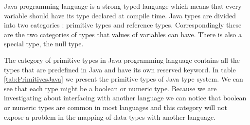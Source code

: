 Java programming language is a strong typed language which means that every variable should have its type declared at compile time\cite{javalangspec}. Java types are divided into two categories : primitive types and reference types\cite{javalangspec}. Correspondingly these are the two categories of types that values of variables can have. There is also a special type, the null type.

The category of primitive types in Java programming language contains all the types that are predefined in Java and have its own reserved keyword. In table \ref{tab:PrimitivesJava} we present the primitive types of Java type system. We can see that each type might be a boolean or numeric type. Because we are investigating about interfacing with another language we can notice that boolean or numeric types are common in most languages and this category will not expose a problem in the mapping of data types with another language.


